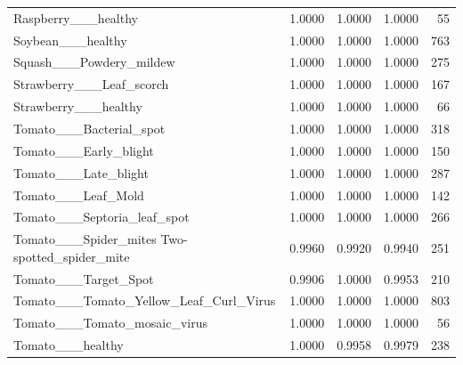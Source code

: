 \begin{tabular}{lrrrr}
Raspberry\_\_\_healthy & 1.0000 & 1.0000 & 1.0000 & 55 \\
Soybean\_\_\_healthy & 1.0000 & 1.0000 & 1.0000 & 763 \\
Squash\_\_\_Powdery\_mildew & 1.0000 & 1.0000 & 1.0000 & 275 \\
Strawberry\_\_\_Leaf\_scorch & 1.0000 & 1.0000 & 1.0000 & 167 \\
Strawberry\_\_\_healthy & 1.0000 & 1.0000 & 1.0000 & 66 \\
Tomato\_\_\_Bacterial\_spot & 1.0000 & 1.0000 & 1.0000 & 318 \\
Tomato\_\_\_Early\_blight & 1.0000 & 1.0000 & 1.0000 & 150 \\
Tomato\_\_\_Late\_blight & 1.0000 & 1.0000 & 1.0000 & 287 \\
Tomato\_\_\_Leaf\_Mold & 1.0000 & 1.0000 & 1.0000 & 142 \\
Tomato\_\_\_Septoria\_leaf\_spot & 1.0000 & 1.0000 & 1.0000 & 266 \\
Tomato\_\_\_Spider\_mites Two-spotted\_spider\_mite & 0.9960 & 0.9920 & 0.9940 & 251 \\
Tomato\_\_\_Target\_Spot & 0.9906 & 1.0000 & 0.9953 & 210 \\
Tomato\_\_\_Tomato\_Yellow\_Leaf\_Curl\_Virus & 1.0000 & 1.0000 & 1.0000 & 803 \\
Tomato\_\_\_Tomato\_mosaic\_virus & 1.0000 & 1.0000 & 1.0000 & 56 \\
Tomato\_\_\_healthy & 1.0000 & 0.9958 & 0.9979 & 238 \\
\bottomrule
\end{tabular}
